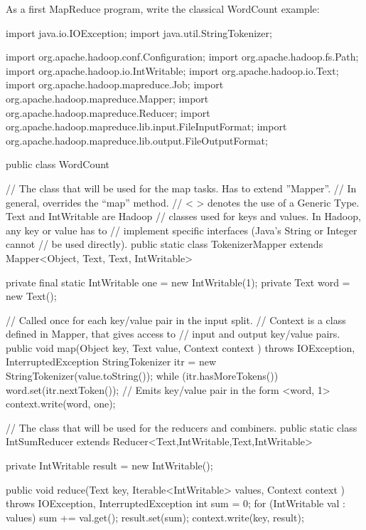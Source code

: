 \documentclass[11pt]{article}
\begin{document}
As a first MapReduce program, write the classical WordCount example:
\begin{java}
  import java.io.IOException;
  import java.util.StringTokenizer;
  
  import org.apache.hadoop.conf.Configuration;
  import org.apache.hadoop.fs.Path;
  import org.apache.hadoop.io.IntWritable;
  import org.apache.hadoop.io.Text;
  import org.apache.hadoop.mapreduce.Job;
  import org.apache.hadoop.mapreduce.Mapper;
  import org.apache.hadoop.mapreduce.Reducer;
  import org.apache.hadoop.mapreduce.lib.input.FileInputFormat;
  import org.apache.hadoop.mapreduce.lib.output.FileOutputFormat;

  public class WordCount {

    // The class that will be used for the map tasks. Has to extend ''Mapper''.
    // In general, overrides the ``map'' method.
    // < > denotes the use of a Generic Type.  Text and IntWritable are Hadoop
    // classes used for keys and values. In Hadoop, any key or value has to
    // implement specific interfaces (Java's String or Integer cannot
    // be used directly). 
    public static class TokenizerMapper
    extends Mapper<Object, Text, Text, IntWritable>{

      private final static IntWritable one = new IntWritable(1);
      private Text word = new Text();

      // Called once for each key/value pair in the input split.
      // Context is a class defined in Mapper, that gives access to
      // input and output key/value pairs.
      public void map(Object key, Text value, Context context
      ) throws IOException, InterruptedException {
        StringTokenizer itr = new StringTokenizer(value.toString());
        while (itr.hasMoreTokens()) {
          word.set(itr.nextToken());
          // Emits key/value pair in the form <word, 1>
          context.write(word, one);
        }
      }
    }

    // The class that will be used for the reducers and combiners.
    public static class IntSumReducer
    extends Reducer<Text,IntWritable,Text,IntWritable> {
      private IntWritable result = new IntWritable();
      
      public void reduce(Text key, Iterable<IntWritable> values,
      Context context
      ) throws IOException, InterruptedException {
        int sum = 0;
        for (IntWritable val : values) {
          sum += val.get();
        }
        result.set(sum);
        context.write(key, result);
      }
    }

}
\end{java}
\end{document}
